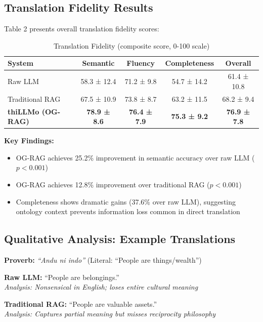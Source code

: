 \documentclass[a4paper,11pt]{article}
\begin{document}
\subsection{Translation Fidelity Results}

Table 2 presents overall translation fidelity scores:

\begin{table}[h]
\centering
\caption{Translation Fidelity (composite score, 0-100 scale)}
\begin{tabular}{@{}lcccc@{}}
\toprule
\textbf{System} & \textbf{Semantic} & \textbf{Fluency} & \textbf{Completeness} & \textbf{Overall} \\
\midrule
Raw LLM & 58.3 ± 12.4 & 71.2 ± 9.8 & 54.7 ± 14.2 & 61.4 ± 10.8 \\
Traditional RAG & 67.5 ± 10.9 & 73.8 ± 8.7 & 63.2 ± 11.5 & 68.2 ± 9.4 \\
\textbf{thiLLMo (OG-RAG)} & \textbf{78.9 ± 8.6} & \textbf{76.4 ± 7.9} & \textbf{75.3 ± 9.2} & \textbf{76.9 ± 7.8} \\
\bottomrule
\end{tabular}
\end{table}

\textbf{Key Findings:}
\begin{itemize}
    \item OG-RAG achieves 25.2\% improvement in semantic accuracy over raw LLM ($p < 0.001$)
    \item OG-RAG achieves 12.8\% improvement over traditional RAG ($p < 0.001$)
    \item Completeness shows dramatic gains (37.6\% over raw LLM), suggesting ontology context prevents information loss common in direct translation
\end{itemize}

\subsection{Qualitative Analysis: Example Translations}

\textbf{Proverb:} \emph{``Andu ni indo''} (Literal: ``People are things/wealth'')

\textbf{Raw LLM:} ``People are belongings.'' \\
\textit{Analysis: Nonsensical in English; loses entire cultural meaning}

\textbf{Traditional RAG:} ``People are valuable assets.'' \\
\textit{Analysis: Captures partial meaning but misses reciprocity philosophy}
\end{document}
